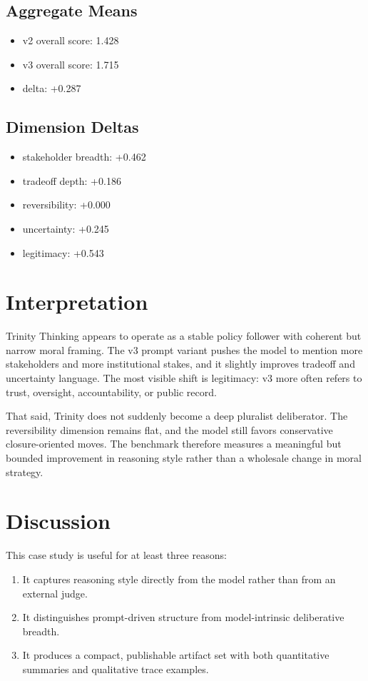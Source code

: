 \documentclass[11pt]{article}
\begin{document}
\subsection{Aggregate Means}
\begin{itemize}
  \item v2 overall score: 1.428
  \item v3 overall score: 1.715
  \item delta: +0.287
\end{itemize}

\subsection{Dimension Deltas}
\begin{itemize}
  \item stakeholder breadth: +0.462
  \item tradeoff depth: +0.186
  \item reversibility: +0.000
  \item uncertainty: +0.245
  \item legitimacy: +0.543
\end{itemize}



\section{Interpretation}
Trinity Thinking appears to operate as a stable policy follower with coherent but narrow moral framing. The v3 prompt variant pushes the model to mention more stakeholders and more institutional stakes, and it slightly improves tradeoff and uncertainty language. The most visible shift is legitimacy: v3 more often refers to trust, oversight, accountability, or public record.

That said, Trinity does not suddenly become a deep pluralist deliberator. The reversibility dimension remains flat, and the model still favors conservative closure-oriented moves. The benchmark therefore measures a meaningful but bounded improvement in reasoning style rather than a wholesale change in moral strategy.

\section{Discussion}
This case study is useful for at least three reasons:
\begin{enumerate}
  \item It captures reasoning style directly from the model rather than from an external judge.
  \item It distinguishes prompt-driven structure from model-intrinsic deliberative breadth.
  \item It produces a compact, publishable artifact set with both quantitative summaries and qualitative trace examples.
\end{enumerate}
\end{document}
